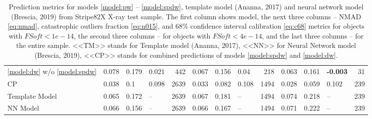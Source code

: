 \documentclass[fleqn,usenatbib]{mnras}
\begin{document}
\begin{table}
\begin{tabular}{llllrlllrlllr}
            \ref{model:dw} w/o \ref{model:spdw} &                             0.078 &           0.179 &            0.021 &         442 &                             0.067 &          0.156 &             0.04 &         218 &                            0.063 &           0.161 &  \textbf{-0.003} &          31 \\
            CP                                  &                             0.038 &             0.1 &            0.098 &        2639 &                             0.033 &          0.082 &            0.108 &        1494 &                            0.028 &           0.059 &            0.102 &         239 \\
            Template Model                      &                             0.065 &           0.172 &           -- &        2639 &                             0.067 &          0.181 &           -- &        1494 &                            0.074 &           0.218 &           -- &         239 \\
            NN Model                            &                             0.066 &           0.156 &           -- &        2639 &                             0.066 &          0.167 &           -- &        1494 &                            0.071 &           0.222 &           -- &         239 \\
            \hline
            \end{tabular}
            \caption{Prediction metrics for models \ref{model:pw} -- \ref{model:spdw}, template model (Ananna, 2017) and neural network model (Brescia, 2019) from Stripe82X X-ray test sample. The first column shows model, the next three columns -- NMAD \eqref{eq:nmad}, catastrophic outliers fraction \eqref{eq:n015}, and 68\% confidence interval calibration \eqref{eq:c68} metrics for objects with $FSoft < 1e-14$, the second three columns -- for objects with $FSoft < 4e-14$, and the last three columns -- for the entire sample. <<TM>> stands for Template model (Ananna, 2017), <<NN>> for Neural Network model (Brescia, 2019), <<CP>> stands for combined predictions of models \ref{model:spdw} and \ref{model:dw}.}
\end{table}
\end{document}
